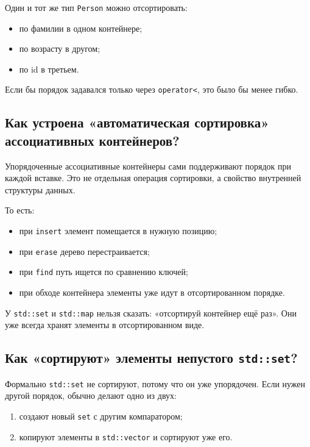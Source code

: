 \begin{example}
Один и тот же тип \texttt{Person} можно отсортировать:
\begin{itemize}
    \item по фамилии в одном контейнере;
    \item по возрасту в другом;
    \item по id в третьем.
\end{itemize}
Если бы порядок задавался только через \texttt{operator<}, это было бы менее гибко.
\end{example}

\subsection{Как устроена «автоматическая сортировка» ассоциативных контейнеров?}
Упорядоченные ассоциативные контейнеры сами поддерживают порядок при каждой вставке. Это не отдельная операция сортировки, а свойство внутренней структуры данных.

То есть:
\begin{itemize}
    \item при \texttt{insert} элемент помещается в нужную позицию;
    \item при \texttt{erase} дерево перестраивается;
    \item при \texttt{find} путь ищется по сравнению ключей;
    \item при обходе контейнера элементы уже идут в отсортированном порядке.
\end{itemize}

\begin{remark}
У \texttt{std::set} и \texttt{std::map} нельзя сказать: «отсортируй контейнер ещё раз». Они уже всегда хранят элементы в отсортированном виде.
\end{remark}

\subsection{Как «сортируют» элементы непустого \texttt{std::set}?}
Формально \texttt{std::set} не сортируют, потому что он уже упорядочен. Если нужен другой порядок, обычно делают одно из двух:
\begin{enumerate}
    \item создают новый \texttt{set} с другим компаратором;
    \item копируют элементы в \texttt{std::vector} и сортируют уже его.
\end{enumerate}

